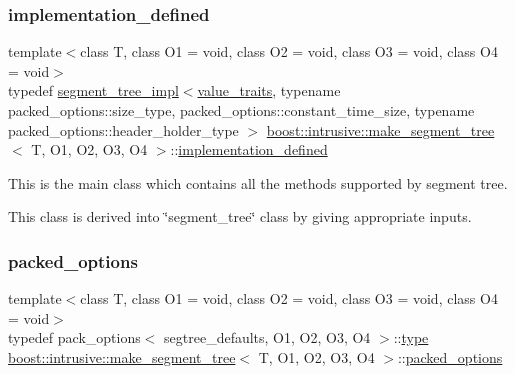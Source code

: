 \subsubsection{\texorpdfstring{implementation\+\_\+defined}{implementation\_defined}}
{\footnotesize\ttfamily template$<$class T, class O1 = void, class O2 = void, class O3 = void, class O4 = void$>$ \\
typedef \hyperlink{classboost_1_1intrusive_1_1segment__tree__impl}{segment\+\_\+tree\+\_\+impl}$<$\hyperlink{structboost_1_1intrusive_1_1make__segment__tree_a865aca881f5d22f89580dc0692503bff}{value\+\_\+traits}, typename packed\+\_\+options\+::size\+\_\+type, packed\+\_\+options\+::constant\+\_\+time\+\_\+size, typename packed\+\_\+options\+::header\+\_\+holder\+\_\+type $>$ \hyperlink{structboost_1_1intrusive_1_1make__segment__tree}{boost\+::intrusive\+::make\+\_\+segment\+\_\+tree}$<$ T, O1, O2, O3, O4 $>$\+::\hyperlink{structboost_1_1intrusive_1_1make__segment__tree_a1a009d43964299a632641ecd7c2b0250}{implementation\+\_\+defined}}


\begin{DoxyItemize}
\item This is the main class which contains all the methods supported by segment tree. 
\item This class is derived into \char`\"{}segment\+\_\+tree\char`\"{} class by giving appropriate inputs. 
\end{DoxyItemize}\mbox{\label{structboost_1_1intrusive_1_1make__segment__tree_ab09dfb845c300bf467f406f8e7545903}} 
\subsubsection{\texorpdfstring{packed\+\_\+options}{packed\_options}}
{\footnotesize\ttfamily template$<$class T, class O1 = void, class O2 = void, class O3 = void, class O4 = void$>$ \\
typedef pack\+\_\+options$<$ segtree\+\_\+defaults, O1, O2, O3, O4 $>$\+::\hyperlink{structboost_1_1intrusive_1_1make__segment__tree_ac52c74ebd4a40dc2d3f2a37145bfe469}{type} \hyperlink{structboost_1_1intrusive_1_1make__segment__tree}{boost\+::intrusive\+::make\+\_\+segment\+\_\+tree}$<$ T, O1, O2, O3, O4 $>$\+::\hyperlink{structboost_1_1intrusive_1_1make__segment__tree_ab09dfb845c300bf467f406f8e7545903}{packed\+\_\+options}}

